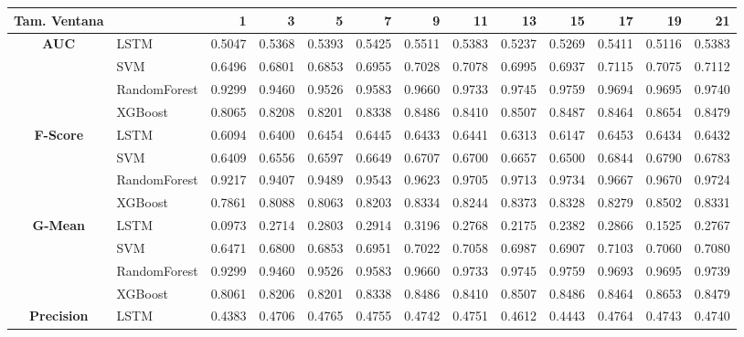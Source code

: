 \begin{table}[h]
\centering
\begin{adjustbox}{max width=15cm}
\begin{tabular}{|c|l|r|r|r|r|r|r|r|r|r|r|r|}
	\hline
	\textbf{Tam. Ventana}&         &      1  &      3  &      5  &      7  &      9  &      11 &      13 &      15 &      17 &      19 &      21 \\
	\hline
	\textbf{AUC} & LSTM &  0.5047 &  0.5368 &  0.5393 &  0.5425 &  0.5511 &  0.5383 &  0.5237 &  0.5269 &  0.5411 &  0.5116 &  0.5383 \\
	& SVM &  0.6496 &  0.6801 &  0.6853 &  0.6955 &  0.7028 &  0.7078 &  0.6995 &  0.6937 &  0.7115 &  0.7075 &  0.7112 \\
	& RandomForest &  0.9299 &  0.9460 &  0.9526 &  0.9583 &  0.9660 &  0.9733 &  0.9745 &  0.9759 &  0.9694 &  0.9695 &  0.9740 \\
	& XGBoost &  0.8065 &  0.8208 &  0.8201 &  0.8338 &  0.8486 &  0.8410 &  0.8507 &  0.8487 &  0.8464 &  0.8654 &  0.8479 \\
	\hline
	\textbf{F-Score} & LSTM &  0.6094 &  0.6400 &  0.6454 &  0.6445 &  0.6433 &  0.6441 &  0.6313 &  0.6147 &  0.6453 &  0.6434 &  0.6432 \\
	& SVM &  0.6409 &  0.6556 &  0.6597 &  0.6649 &  0.6707 &  0.6700 &  0.6657 &  0.6500 &  0.6844 &  0.6790 &  0.6783 \\
	& RandomForest &  0.9217 &  0.9407 &  0.9489 &  0.9543 &  0.9623 &  0.9705 &  0.9713 &  0.9734 &  0.9667 &  0.9670 &  0.9724 \\
	& XGBoost &  0.7861 &  0.8088 &  0.8063 &  0.8203 &  0.8334 &  0.8244 &  0.8373 &  0.8328 &  0.8279 &  0.8502 &  0.8331 \\
	\hline
	\textbf{G-Mean} & LSTM &  0.0973 &  0.2714 &  0.2803 &  0.2914 &  0.3196 &  0.2768 &  0.2175 &  0.2382 &  0.2866 &  0.1525 &  0.2767 \\
	& SVM &  0.6471 &  0.6800 &  0.6853 &  0.6951 &  0.7022 &  0.7058 &  0.6987 &  0.6907 &  0.7103 &  0.7060 &  0.7080 \\
	& RandomForest &  0.9299 &  0.9460 &  0.9526 &  0.9583 &  0.9660 &  0.9733 &  0.9745 &  0.9759 &  0.9693 &  0.9695 &  0.9739 \\
	& XGBoost &  0.8061 &  0.8206 &  0.8201 &  0.8338 &  0.8486 &  0.8410 &  0.8507 &  0.8486 &  0.8464 &  0.8653 &  0.8479 \\
	\hline
	\textbf{Precision} & LSTM &  0.4383 &  0.4706 &  0.4765 &  0.4755 &  0.4742 &  0.4751 &  0.4612 &  0.4443 &  0.4764 &  0.4743 &  0.4740 \\

\end{tabular}
\end{adjustbox}
\end{table}
